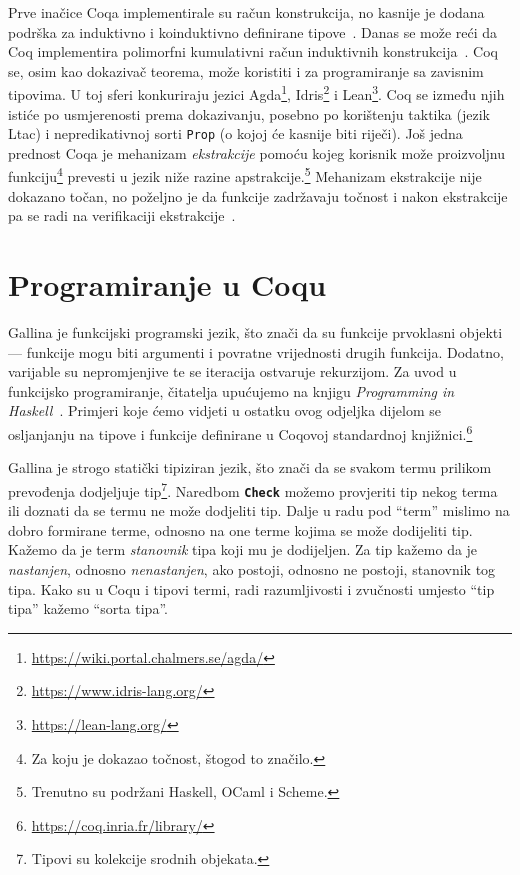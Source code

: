 Prve inačice Coqa implementirale su račun konstrukcija, no kasnije je dodana podrška za induktivno i koinduktivno definirane tipove~\cite{cic, coinductive}.
Danas se može reći da Coq implementira polimorfni kumulativni račun induktivnih konstrukcija~\cite{coqcoqcorrect}.
Coq se, osim kao dokazivač teorema, može koristiti i za programiranje sa zavisnim tipovima.
U toj sferi konkuriraju jezici Agda\footnote{\url{https://wiki.portal.chalmers.se/agda/}}, Idris\footnote{\url{https://www.idris-lang.org/}} i Lean\footnote{\url{https://lean-lang.org/}}. Coq se između njih istiće po usmjerenosti prema dokazivanju, posebno po korištenju taktika (jezik Ltac) i nepredikativnoj sorti \texttt{Prop} (o kojoj će kasnije biti riječi).
Još jedna prednost Coqa je mehanizam \textit{ekstrakcije} pomoću kojeg korisnik može proizvoljnu funkciju\footnote{Za koju je dokazao točnost, štogod to značilo.} prevesti u jezik niže razine apstrakcije.\footnote{Trenutno su podržani Haskell, OCaml i Scheme.}
Mehanizam ekstrakcije nije dokazano točan, no poželjno je da funkcije zadržavaju točnost i nakon ekstrakcije pa se radi na verifikaciji ekstrakcije~\cite{coqcoqcorrect}.

\section{Programiranje u Coqu}\label{sec:programiranje-u-gallini}
Gallina je funkcijski programski jezik, što znači da su funkcije prvoklasni objekti ---
funkcije mogu biti argumenti i povratne vrijednosti drugih funkcija.
Dodatno, varijable su nepromjenjive  te se iteracija ostvaruje rekurzijom.
Za uvod u funkcijsko programiranje, čitatelja upućujemo na knjigu \textit{Programming in Haskell}~\cite{Hutton_2016}.
Primjeri koje ćemo vidjeti u ostatku ovog odjeljka dijelom se osljanjanju na tipove i funkcije definirane u Coqovoj standardnoj knjižnici.\footnote{\url{https://coq.inria.fr/library/}}

Gallina je strogo statički tipiziran jezik, što znači da se svakom termu prilikom prevođenja dodjeljuje tip\footnote{Tipovi su kolekcije srodnih objekata.}.
Naredbom \texttt{\textbf{Check}} možemo provjeriti tip nekog terma ili doznati da se termu ne može dodjeliti tip.
Dalje u radu pod ``term'' mislimo na dobro formirane terme, odnosno na one terme kojima se može dodijeliti tip.
Kažemo da je term \textit{stanovnik} tipa koji mu je dodijeljen.
Za tip kažemo da je \textit{nastanjen}, odnosno \textit{nenastanjen}, ako postoji, odnosno ne postoji, stanovnik tog tipa.
Kako su u Coqu i tipovi termi, radi razumljivosti i zvučnosti umjesto ``tip tipa'' kažemo ``sorta tipa''.

